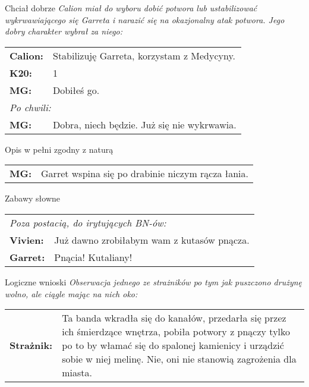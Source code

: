 \documentclass[10pt,twoside,twocolumn]{book}
\begin{document}
\begin{rpg-quotebox}{Chciał dobrze}
\textit{Calion miał do wyboru dobić potwora lub ustabilizować wykrwawiającego się Garreta i narazić się na okazjonalny atak potwora. Jego dobry charakter wybrał za niego:}\\
   
   \begin{tabularx}{\columnwidth}{lX}
      \textbf{Calion:} & Stabilizuję Garreta, korzystam z Medycyny.\\
      \textbf{K20:} & 1\\
      \textbf{MG:} & Dobiłeś go.\\
      \multicolumn{2}{l}{\textit{Po chwili:}}\\
      \textbf{MG:} & Dobra, niech będzie. Już się nie wykrwawia.\\
   \end{tabularx}
\end{rpg-quotebox}

\begin{rpg-quotebox}{Opis w pełni zgodny z naturą}
   \begin{tabularx}{\columnwidth}{lX}
   \textbf{MG:} & Garret wspina się po drabinie niczym rącza łania.\\
   \end{tabularx}
\end{rpg-quotebox}

\begin{rpg-quotebox}{Zabawy słowne}
   \begin{tabularx}{\columnwidth}{lX}
      \multicolumn{2}{l}{\textit{Poza postacią, do irytujących BN-ów:}}\\
      \textbf{Vivien:} & Już dawno zrobiłabym wam z kutasów pnącza.\\
      \textbf{Garret:} & Pnącia! Kutaliany!\\
   \end{tabularx}
\end{rpg-quotebox}

\begin{rpg-quotebox}{Logiczne wnioski}
   \textit{Obserwacja jednego ze strażników po tym jak puszczono drużynę wolno, ale ciągle mając na nich oko:}\\
   
   \begin{tabularx}{\columnwidth}{lX}
      \textbf{Strażnik:} & Ta banda wkradła się do kanałów, przedarła się przez ich śmierdzące wnętrza, pobiła potwory z pnączy tylko po to by włamać się do spalonej kamienicy i urządzić sobie w niej melinę. Nie, oni nie stanowią zagrożenia dla miasta.\\
   \end{tabularx}
\end{rpg-quotebox}
\end{document}
